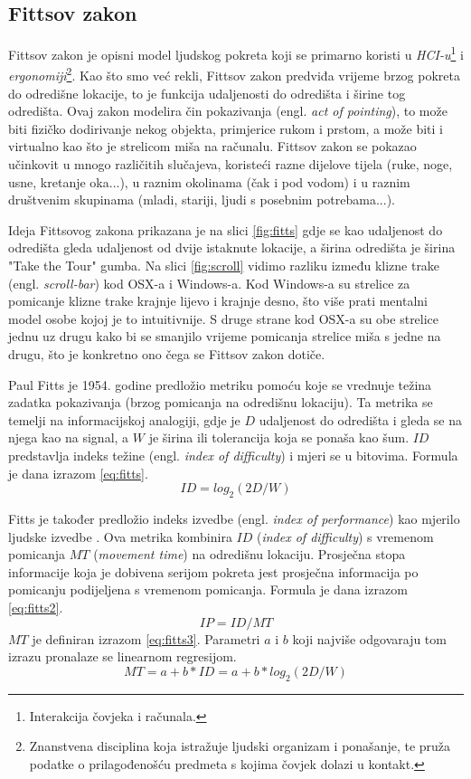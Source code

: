 \documentclass[times, utf8, zavrsni]{fer}
\begin{document}
\subsection{Fittsov zakon}
Fittsov zakon je opisni model ljudskog pokreta koji se primarno koristi u \emph{HCI-u}\footnote{Interakcija čovjeka i računala.} i \emph{ergonomiji}\footnote{Znanstvena disciplina koja istražuje ljudski organizam i ponašanje, te pruža podatke o prilagođenošću predmeta s kojima čovjek dolazi u kontakt.}. Kao što smo već rekli, Fittsov zakon predviđa vrijeme brzog pokreta do odredišne lokacije, to je funkcija udaljenosti do odredišta i širine tog odredišta. Ovaj zakon modelira čin pokazivanja (engl. \emph{act of pointing}), to može biti fizičko dodirivanje nekog objekta, primjerice rukom i prstom, a može biti i virtualno kao što je strelicom miša na računalu. Fittsov zakon se pokazao učinkovit u mnogo različitih slučajeva, koristeći razne dijelove tijela (ruke, noge, usne, kretanje oka...), u raznim okolinama (čak i pod vodom) i u raznim društvenim skupinama (mladi, stariji, ljudi s posebnim potrebama...). 

Ideja Fittsovog zakona prikazana je na slici \ref{fig:fitts} gdje se kao udaljenost do odredišta gleda udaljenost od dvije istaknute lokacije, a širina odredišta je širina "Take the Tour" gumba. Na slici \ref{fig:scroll} vidimo razliku između klizne trake (engl. \emph{scroll-bar}) kod OSX-a i Windows-a. Kod Windows-a su strelice za pomicanje klizne trake krajnje lijevo i krajnje desno, što više prati mentalni model osobe kojoj je to intuitivnije. S druge strane kod OSX-a su obe strelice jednu uz drugu kako bi se smanjilo vrijeme pomicanja strelice miša s jedne na drugu, što je konkretno ono čega se Fittsov zakon dotiče.

Paul Fitts je 1954. godine predložio metriku pomoću koje se vrednuje težina zadatka pokazivanja (brzog pomicanja na odredišnu lokaciju). Ta metrika se temelji na informacijskoj analogiji, gdje je $D$ udaljenost do odredišta i gleda se na njega kao na signal, a $W$ je širina ili tolerancija koja se ponaša kao šum. $ID$ predstavlja indeks težine (engl. \emph{index of difficulty}) i mjeri se u bitovima. Formula je dana izrazom \ref{eq:fitts}.
\begin{equation}
\label{eq:fitts}
ID = log_2(2D/W)
\end{equation}

Fitts je također predložio indeks izvedbe (engl. \emph{index of performance}) kao mjerilo ljudske izvedbe . Ova metrika kombinira $ID$ (\emph{index of difficulty}) s vremenom pomicanja $MT$ (\emph{movement time}) na odredišnu lokaciju. Prosječna stopa informacije koja je dobivena serijom pokreta jest prosječna informacija po pomicanju podijeljena s vremenom pomicanja. Formula je dana izrazom \ref{eq:fitts2}.
\begin{equation}
\label{eq:fitts2}
IP = ID/MT
\end{equation}
$MT$ je definiran izrazom \ref{eq:fitts3}. Parametri $a$ i $b$ koji najviše odgovaraju tom izrazu pronalaze se linearnom regresijom.
\begin{equation}
\label{eq:fitts3}
MT = a+b*ID = a+b*log_2(2D/W)
\end{equation}
\end{document}
